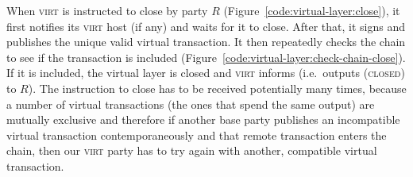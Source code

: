   When \textsc{virt} is instructed to close by party $R$
  (Figure~\ref{code:virtual-layer:close}), it first notifies its \textsc{virt}
  host (if any) and waits for it to close. After that, it signs and publishes
  the unique valid virtual transaction. It then repeatedly checks the chain to
  see if the transaction is included
  (Figure~\ref{code:virtual-layer:check-chain-close}). If it is included, the
  virtual layer is closed and \textsc{virt} informs (i.e.\ outputs
  (\textsc{closed}) to $R$). The
  instruction to close has to be received potentially many times, because a
  number of virtual transactions (the ones that spend the same output) are
  mutually exclusive and therefore if another base party publishes an
  incompatible virtual transaction contemporaneously and that remote transaction
  enters the chain, then our \textsc{virt} party has to try again with another,
  compatible virtual transaction.
